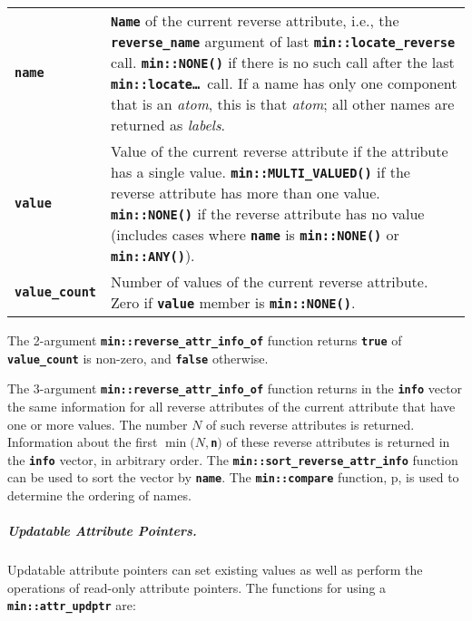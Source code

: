 \documentclass[12pt]{article}
\makeatletter
\newcommand{\subsubsubsubsection}[1]{\subparagraph[#1]{#1.}}
\newcommand{\TT}[1]{{\tt \bfseries #1}}
\newcommand{\ttmkey}[2]{\TT{#1}\index{#1@{\tt #1}!#2}}
\newcommand{\pagref}[1]{p\pageref{#1}}
\newcommand{\EOL}{\penalty \exhyphenpenalty}
\newenvironment{indpar}[1][0.3in]%
	{\begin{list}{}%
		     {\setlength{\itemsep}{0in}%
		      \setlength{\topsep}{0in}%
		      \setlength{\parsep}{1ex}%
		      \setlength{\labelwidth}{#1}%
		      \setlength{\leftmargin}{#1}%
		      \addtolength{\leftmargin}{\labelsep}}%
	 \item}%
	{\end{list}}
\makeatother
\begin{document}
\begin{indpar}
\begin{tabular}{lp{4.5in}}
\ttmkey{name}{member of!{\tt min::reverse\_attr\_info}}
    & \TT{Name} of the current reverse attribute, i.e., the
      \TT{reverse\_\EOL name}
      argument of last \TT{min::\EOL locate\_\EOL reverse} call.
      \TT{min::NONE()} if there is no such call after the last
      \TT{min::\EOL locate\ldots}~call.
      If a name has only one component that is an {\em atom},
      this is that {\em atom}; all other names are returned as {\em labels}.
\\[0.5ex]
\ttmkey{value}{member of!{\tt min::reverse\_attr\_info}}
    & Value of the current reverse attribute if the attribute
      has a single value.  \TT{min::\EOL MULTI\_\EOL VALUED()}
      if the reverse attribute has more than one value.
      \TT{min::\EOL NONE()} if the reverse attribute has no value
      (includes cases where \TT{name} is \TT{min::\EOL NONE()} or
      \TT{min::\EOL ANY()}).
\\[0.5ex]
\ttmkey{value\_count}{member of!{\tt min::reverse\_attr\_info}}
    & Number of values of the current reverse attribute.
      Zero if \TT{value} member is \TT{min::\EOL NONE()}.
\end{tabular}
\end{indpar}

The 2-argument \TT{min::reverse\_attr\_info\_of} function returns \TT{true}
of \TT{value\_\EOL count} is non-zero, and \TT{false} otherwise.

The 3-argument \TT{min::reverse\_attr\_info\_of} function returns in the
\TT{info} vector the same information
for all reverse attributes of the current attribute that
have one or more values.  The number $N$ of such
reverse attributes is returned.  Information about the first $\min(N,$\TT{n}$)$
of these reverse attributes is returned in the \TT{info} vector,
in arbitrary order.
The \TT{min::\EOL sort\_\EOL reverse\_\EOL attr\_\EOL info}
function can be used to sort the vector by \TT{name}.
The \TT{min::\EOL compare} function, \pagref{MIN::COMPARE},
is used to determine the ordering of names.

\subsubsubsubsection{Updatable Attribute Pointers}
\label{UPDATABLE-ATTRIBUTE-POINTERS}

Updatable attribute pointers%
can set existing values as well as perform
the operations of read-only attribute pointers.
The functions for using a \TT{min::\EOL attr\_\EOL updptr}
are:\label{UPDATABLE-ATTRIBUTE-FUNCTIONS}
\end{document}
